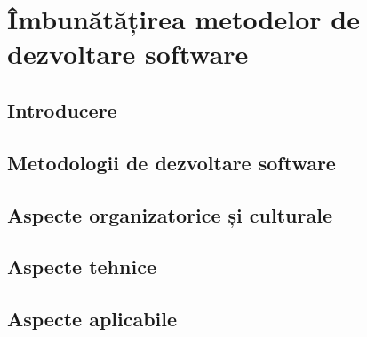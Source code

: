 \chapter{Îmbunătățirea metodelor de dezvoltare software}
\section{Introducere}

\section{Metodologii de dezvoltare software}

\section{Aspecte organizatorice și culturale}

\section{Aspecte tehnice}

\section{Aspecte aplicabile}
